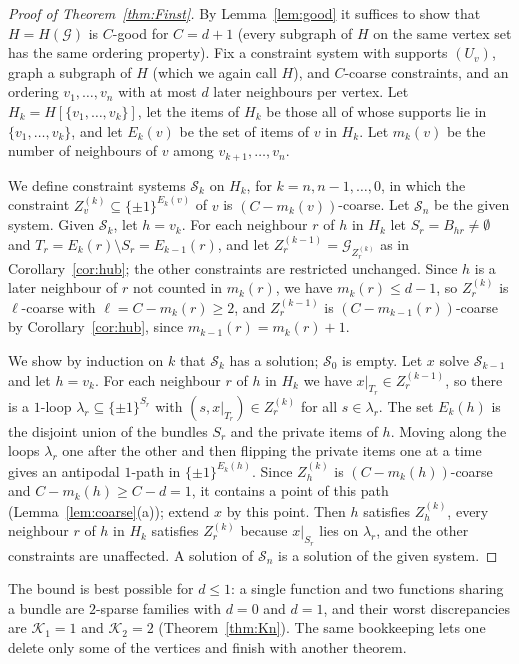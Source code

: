 \documentclass[11pt,letterpaper]{article}
\theoremstyle{definition}
\newcommand{\cG}{\mathcal{G}}
\newcommand{\cube}[1]{\{\pm1\}^{#1}}
\begin{document}
\begin{proof}[Proof of Theorem~\ref{thm:Finst}]
By Lemma~\ref{lem:good} it suffices to show that $H=H(\cG)$ is $C$-good for $C=d+1$ (every
subgraph of $H$ on the same vertex set has the same ordering property). Fix a constraint system
with supports $(U_v)$, graph a subgraph of $H$ (which we again call $H$), and $C$-coarse
constraints, and an ordering $v_1,\dots,v_n$ with at most $d$ later neighbours per vertex. Let
$H_k=H[\{v_1,\dots,v_k\}]$, let the items of $H_k$ be those all of whose supports lie in
$\{v_1,\dots,v_k\}$, and let $E_k(v)$ be the set of items of $v$ in $H_k$. Let $m_k(v)$ be the number
of neighbours of $v$ among $v_{k+1},\dots,v_n$.

We define constraint systems $\mathcal S_k$ on $H_k$, for $k=n,n-1,\dots,0$, in which the
constraint $Z^{(k)}_v\subseteq\cube{E_k(v)}$ of $v$ is $(C-m_k(v))$-coarse. Let $\mathcal S_n$ be
the given system. Given $\mathcal S_k$, let $h=v_k$. For each neighbour $r$ of $h$ in $H_k$ let
$S_r=B_{hr}\ne\emptyset$ and $T_r=E_k(r)\setminus S_r=E_{k-1}(r)$, and let
$Z^{(k-1)}_r=\cG_{Z^{(k)}_r}$ as in Corollary~\ref{cor:hub}; the other constraints are restricted
unchanged. Since $h$ is a later neighbour of $r$ not counted in $m_k(r)$, we have $m_k(r)\le d-1$, so
$Z^{(k)}_r$ is $\ell$-coarse with $\ell=C-m_k(r)\ge2$, and $Z^{(k-1)}_r$ is
$(C-m_{k-1}(r))$-coarse by Corollary~\ref{cor:hub}, since $m_{k-1}(r)=m_k(r)+1$.

We show by induction on $k$ that $\mathcal S_k$ has a solution; $\mathcal S_0$ is empty. Let $x$
solve $\mathcal S_{k-1}$ and let $h=v_k$. For each neighbour $r$ of $h$ in $H_k$ we have
$x|_{T_r}\in Z^{(k-1)}_r$, so there is a $1$-loop $\lambda_r\subseteq\cube{S_r}$ with
$(s,x|_{T_r})\in Z^{(k)}_r$ for all $s\in\lambda_r$. The set $E_k(h)$ is the disjoint union of the
bundles $S_r$ and the private items of $h$. Moving along the loops $\lambda_r$ one after the other
and then flipping the private items one at a time gives an antipodal $1$-path in
$\cube{E_k(h)}$. Since $Z^{(k)}_h$ is $(C-m_k(h))$-coarse and $C-m_k(h)\ge C-d=1$, it contains a
point of this path (Lemma~\ref{lem:coarse}(a)); extend $x$ by this point. Then $h$ satisfies
$Z^{(k)}_h$, every neighbour $r$ of $h$ in $H_k$ satisfies $Z^{(k)}_r$ because $x|_{S_r}$ lies on
$\lambda_r$, and the other constraints are unaffected. A solution of $\mathcal S_n$ is a solution of
the given system.
\end{proof}

The bound is best possible for $d\le1$: a single function and two functions sharing a bundle are
$2$-sparse families with $d=0$ and $d=1$, and their worst discrepancies are $\mathcal{K}_1=1$ and $\mathcal{K}_2=2$
(Theorem~\ref{thm:Kn}). The same bookkeeping lets one delete only some of the vertices and finish
with another theorem.
\end{document}
